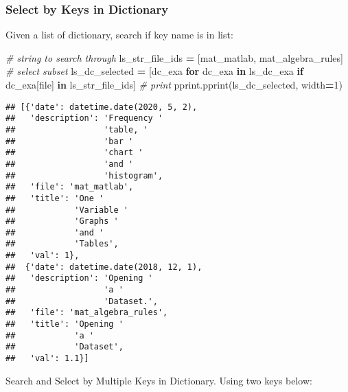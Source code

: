\documentclass[
]{book}
\newenvironment{Shaded}{\begin{snugshade}}{\end{snugshade}}
\newcommand{\CommentTok}[1]{\textcolor[rgb]{0.56,0.35,0.01}{\textit{#1}}}
\newcommand{\ControlFlowTok}[1]{\textcolor[rgb]{0.13,0.29,0.53}{\textbf{#1}}}
\newcommand{\DecValTok}[1]{\textcolor[rgb]{0.00,0.00,0.81}{#1}}
\newcommand{\KeywordTok}[1]{\textcolor[rgb]{0.13,0.29,0.53}{\textbf{#1}}}
\newcommand{\NormalTok}[1]{#1}
\newcommand{\OperatorTok}[1]{\textcolor[rgb]{0.81,0.36,0.00}{\textbf{#1}}}
\newcommand{\StringTok}[1]{\textcolor[rgb]{0.31,0.60,0.02}{#1}}
\begin{document}
\hypertarget{select-by-keys-in-dictionary}{%
\subsubsection{Select by Keys in Dictionary}\label{select-by-keys-in-dictionary}}

Given a list of dictionary, search if key name is in list:

\begin{Shaded}
\begin{Highlighting}[]
\CommentTok{\# string to search through}
\NormalTok{ls\_str\_file\_ids }\OperatorTok{=}\NormalTok{ [}\StringTok{\textquotesingle{}mat\_matlab\textquotesingle{}}\NormalTok{, }\StringTok{\textquotesingle{}mat\_algebra\_rules\textquotesingle{}}\NormalTok{]}
\CommentTok{\# select subset}
\NormalTok{ls\_dc\_selected }\OperatorTok{=}\NormalTok{ [dc\_exa}
                  \ControlFlowTok{for}\NormalTok{ dc\_exa }\KeywordTok{in}\NormalTok{ ls\_dc\_exa}
                  \ControlFlowTok{if}\NormalTok{ dc\_exa[}\StringTok{\textquotesingle{}file\textquotesingle{}}\NormalTok{] }\KeywordTok{in}\NormalTok{ ls\_str\_file\_ids]}
\CommentTok{\# print}
\NormalTok{pprint.pprint(ls\_dc\_selected, width}\OperatorTok{=}\DecValTok{1}\NormalTok{)}
\end{Highlighting}
\end{Shaded}

\begin{verbatim}
## [{'date': datetime.date(2020, 5, 2),
##   'description': 'Frequency '
##                  'table, '
##                  'bar '
##                  'chart '
##                  'and '
##                  'histogram',
##   'file': 'mat_matlab',
##   'title': 'One '
##            'Variable '
##            'Graphs '
##            'and '
##            'Tables',
##   'val': 1},
##  {'date': datetime.date(2018, 12, 1),
##   'description': 'Opening '
##                  'a '
##                  'Dataset.',
##   'file': 'mat_algebra_rules',
##   'title': 'Opening '
##            'a '
##            'Dataset',
##   'val': 1.1}]
\end{verbatim}

Search and Select by Multiple Keys in Dictionary. Using two keys below:
\end{document}
